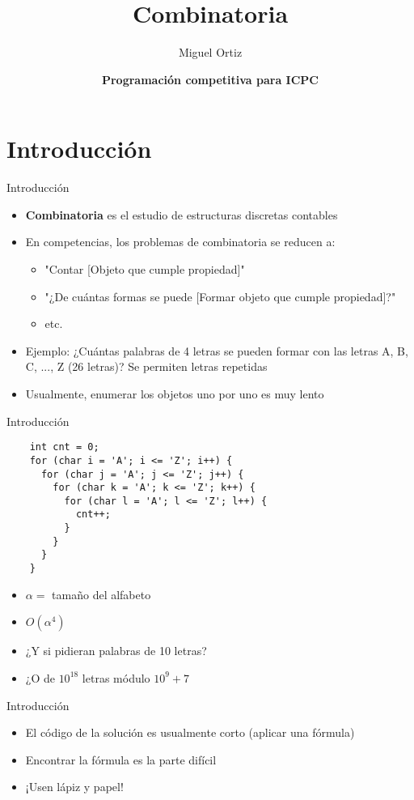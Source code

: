 \documentclass[10pt]{beamer}
\title{Combinatoria}
\author{Miguel Ortiz}
\institute{Mayo 2023 - Cochabamba, Bolivia}
\date{\textbf{Programación competitiva para ICPC}}
\newcommand{\bi}{\begin{itemize}}
\newcommand{\ei}{\end{itemize}}
\begin{document}
\maketitle

\section{Introducción}

\begin{frame}{Introducción}
  \bi
    \item \textbf{Combinatoria} es el estudio de estructuras discretas contables
    \item En competencias, los problemas de combinatoria se reducen a:
      \bi
        \item "Contar [Objeto que cumple propiedad]"
        \item "¿De cuántas formas se puede [Formar objeto que cumple propiedad]?"
        \item etc.
      \ei 
    \item Ejemplo: ¿Cuántas palabras de 4 letras se pueden formar con las letras A, B, C, ..., Z (26 letras)? Se permiten letras repetidas
    \item<2-> Usualmente, enumerar los objetos uno por uno es muy lento
  \ei
\end{frame}

\begin{frame}[fragile]{Introducción}
  \begin{verbatim}
    int cnt = 0;
    for (char i = 'A'; i <= 'Z'; i++) {
      for (char j = 'A'; j <= 'Z'; j++) {
        for (char k = 'A'; k <= 'Z'; k++) {
          for (char l = 'A'; l <= 'Z'; l++) {
            cnt++;
          }
        }
      }
    }
  \end{verbatim}
  \bi
    \item $\alpha = $ tamaño del alfabeto
    \item $O(\alpha^4)$
    \item<3-> ¿Y si pidieran palabras de 10 letras?
    \item<4-> ¿O de $10^{18}$ letras módulo $10^9+7$
  \ei
\end{frame}

\begin{frame}{Introducción}
  \bi
    \item El código de la solución es usualmente corto (aplicar una fórmula)
    \item Encontrar la fórmula es la parte difícil
    \item<2-> ¡Usen lápiz y papel!
  \ei
\end{frame}
\end{document}
